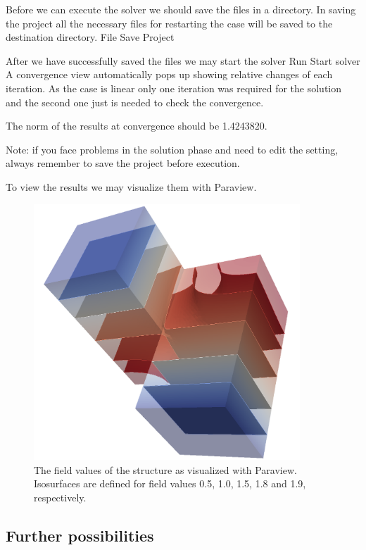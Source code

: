 Before we can execute the solver we should save the files in a directory. In saving the project all the
necessary files for restarting the case will be saved to the 
destination directory.
\ttbegin
File 
  Save Project
\ttend

After we have successfully saved the files we may start the solver
\ttbegin
Run
  Start solver
\ttend
A convergence view automatically pops up showing relative changes of each iteration.
As the case is linear only one iteration was required for the solution and the second one
just is needed to check the convergence. 

The norm of the results at convergence should be 1.4243820.

Note: if you face problems in the solution phase and need to edit the setting, always remember to save
the project before execution.

To view the results we may visualize them with Paraview.

\begin{figure}
\begin{center}
\includegraphics[width=100mm]{ModelPDE_Sol}
\caption{The field values of the structure as visualized with Paraview. Isosurfaces are 
defined for field values 0.5, 1.0, 1.5, 1.8 and 1.9, respectively.}\label{fg:post1}
\end{center}
\end{figure}


\subsection*{Further possibilities}

